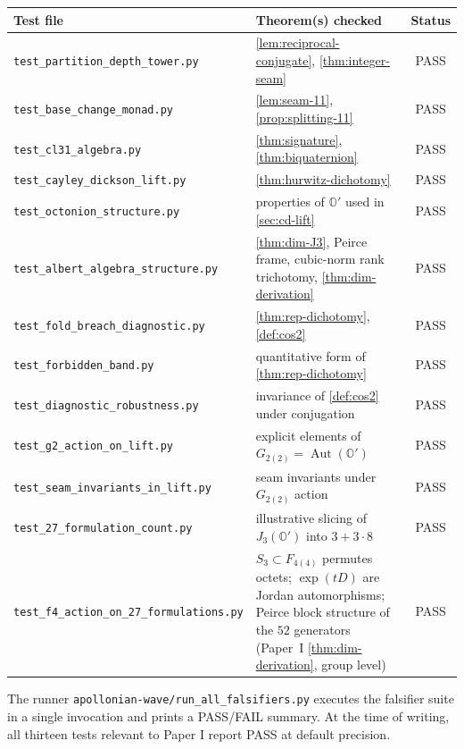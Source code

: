 \documentclass[11pt,a4paper]{article}
\theoremstyle{plain}
\theoremstyle{definition}
\theoremstyle{remark}
\numberwithin{equation}{section}
\providecommand{\Os}{\mathbb{O}'}
\DeclareMathOperator{\Aut}{Aut}
\begin{document}
\begin{center}
\renewcommand{\arraystretch}{1.25}
\small
\begin{tabular}{l l c}
\toprule
\textbf{Test file} & \textbf{Theorem(s) checked} & \textbf{Status} \\
\midrule
\texttt{test\_partition\_depth\_tower.py}
  & \cref{lem:reciprocal-conjugate}, \cref{thm:integer-seam}
  & PASS\\
\texttt{test\_base\_change\_monad.py}
  & \cref{lem:seam-11}, \cref{prop:splitting-11}
  & PASS\\
\texttt{test\_cl31\_algebra.py}
  & \cref{thm:signature}, \cref{thm:biquaternion}
  & PASS\\
\texttt{test\_cayley\_dickson\_lift.py}
  & \cref{thm:hurwitz-dichotomy}
  & PASS\\
\texttt{test\_octonion\_structure.py}
  & properties of $\Os$ used in \cref{sec:cd-lift}
  & PASS\\
\texttt{test\_albert\_algebra\_structure.py}
  & \cref{thm:dim-J3}, Peirce frame, cubic-norm
    rank trichotomy, \cref{thm:dim-derivation}
  & PASS\\
\texttt{test\_fold\_breach\_diagnostic.py}
  & \cref{thm:rep-dichotomy}, \cref{def:cos2}
  & PASS\\
\texttt{test\_forbidden\_band.py}
  & quantitative form of \cref{thm:rep-dichotomy}
  & PASS\\
\texttt{test\_diagnostic\_robustness.py}
  & invariance of \cref{def:cos2} under conjugation
  & PASS\\
\texttt{test\_g2\_action\_on\_lift.py}
  & explicit elements of $G_{2(2)} = \Aut(\Os)$
  & PASS\\
\texttt{test\_seam\_invariants\_in\_lift.py}
  & seam invariants under $G_{2(2)}$ action
  & PASS\\
\texttt{test\_27\_formulation\_count.py}
  & illustrative slicing of $J_3(\Os)$ into $3 + 3 \cdot 8$
  & PASS\\
\texttt{test\_f4\_action\_on\_27\_formulations.py}
  & $S_3 \subset F_{4(4)}$ permutes octets; $\exp(tD)$ are
    Jordan automorphisms; Peirce block structure of the $52$
    generators (Paper~I \cref{thm:dim-derivation}, group level)
  & PASS\\
\bottomrule
\end{tabular}
\end{center}

The runner \texttt{apollonian-wave/run\_all\_falsifiers.py}
executes the falsifier suite in a single invocation and prints a
PASS/FAIL summary.  At the time of writing, all thirteen tests
relevant to Paper I report PASS at default precision.
\end{document}

